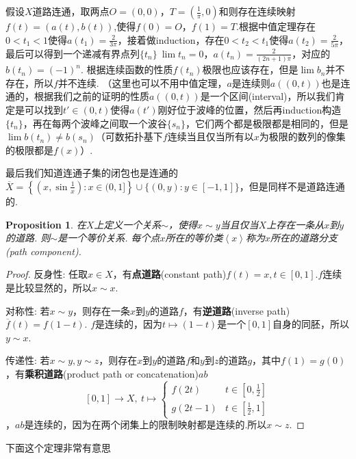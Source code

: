 \documentclass{article}
\newtheorem{proposition}[theorem]{Proposition}
\begin{document}
假设$X$道路连通，取两点$O=(0,0)$，$T=(\frac{1}{\pi},0)$和则存在连续映射$f(t)=(a(t),b(t))$,使得$f(0)=O$，$f(1)=T$.根据中值定理存在$0<t_1<1$使得$a(t_1)=\frac{2}{3\pi}$，接着做induction，存在$0<t_2<t_1$使得$a(t_2) = \frac{2}{5\pi}$，最后可以得到一个递减有界点列$\{t_n\} \ \lim t_n = 0$，$a(t_n) = \frac{2}{(2n+1)\pi}$，对应的$b(t_n)=(-1)^n$. 根据连续函数的性质${f(t_n)}$极限也应该存在，但是$\lim b_n$并不存在，所以$f$并不连续. （这里也可以不用中值定理，$a$是连续则$a((0,t))$也是连通的，根据我们之前的证明的性质$a((0,t))$是一个区间\rm(interval)，所以我们肯定是可以找到$t' \in (0,t)$使得$a(t')$刚好位于波峰的位置，然后再induction构造$\{t_n\}$，再在每两个波峰之间取一个波谷$\{s_n\}$，它们两个都是极限都是相同的，但是$\lim b(t_n) \neq b(s_n)$（可数拓扑基下$f$连续当且仅当所有以$x$为极限的数列的像集的极限都是$f(x)$）.


最后我们知道连通子集的闭包也是连通的$\overline{X} = \left\{  \left( x, \sin \tfrac{1}{x}  \right ) :  x \in (0,1] \right\} \cup \{(0,y) : y \in [-1,1]\}$，但是同样不是道路连通的.

\begin{proposition}
\rm 在$X$上定义一个关系$\sim$，使得$x \sim y$当且仅当$X$上存在一条从$x$到$y$的道路. 则$\sim$是一个等价关系. 每个点$x$所在的等价类$\left<x \right>$称为$x$所在的道路分支(path component).
\end{proposition}

\begin{proof}
反身性: 任取$x \in X$，有\textbf{点道路}(constant path)$f(t) = x,t \in [0,1]$.$f$连续是比较显然的，所以$x \sim x$.

对称性: 若$x \sim y$，则存在一条$x$到$y$的道路$f$，有\textbf{逆道路}(inverse path)$\overline{f}(t)=f(1-t)$. $f$是连续的，因为$t \mapsto (1-t)$是一个$[0,1]$自身的同胚，所以$y \sim x$.

传递性: 若$x \sim y, y \sim z$，则存在$x$到$y$的道路$f$和$y$到$z$的道路$g$，其中$f(1) = g(0)$，有\textbf{乘积道路}(product path or concatenation)$ab$ \[[0,1]\rightarrow X, \ t \mapsto \begin{cases} f(2t) & t \in [0,\frac{1}{2}] \\ g(2t-1) & t \in [\frac{1}{2},1] \end{cases}\]，$ab$是连续的，因为在两个闭集上的限制映射都是连续的.所以$x \sim z$.
\end{proof}

下面这个定理非常有意思
\end{document}
